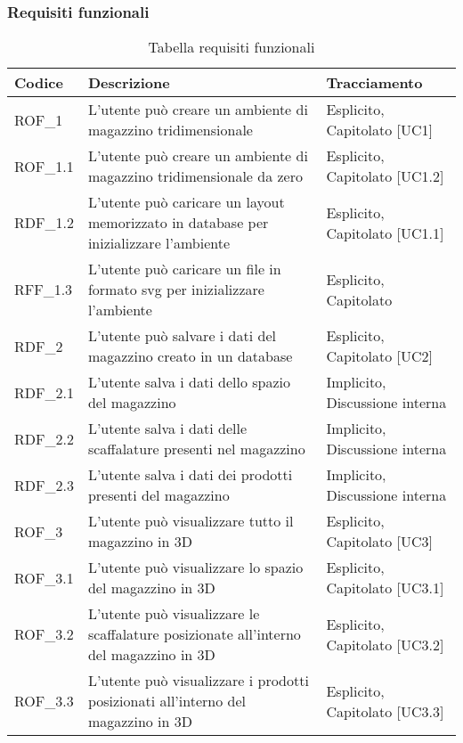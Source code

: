 \subsubsection{Requisiti funzionali}\label{subsec:requisiti_funzionali}
\renewcommand{\arraystretch}{2.5}
\begin{xltabular}{\textwidth}{ p{0.1\textwidth} | X | p{0.3\textwidth} }
    \textbf{\color{white} Codice} & \textbf{\color{white} Descrizione} & \textbf{\color{white} Tracciamento} \\ 
    \endhead

    \caption{Tabella requisiti funzionali} 
    \endlastfoot

    ROF\_1 & L'utente può creare un ambiente di magazzino tridimensionale & Esplicito, Capitolato [UC1]\\
    ROF\_1.1 & L'utente può creare un ambiente di magazzino tridimensionale da zero & Esplicito, Capitolato [UC1.2]\\
    RDF\_1.2 & L'utente può caricare un layout memorizzato in database per inizializzare l'ambiente & Esplicito, Capitolato [UC1.1]\\
    RFF\_1.3 & L'utente può caricare un file in formato svg per inizializzare l'ambiente & Esplicito, Capitolato \\
    RDF\_2 & L'utente può salvare i dati del magazzino creato in un database & Esplicito, Capitolato [UC2]\\  
    RDF\_2.1 & L'utente salva i dati dello spazio del magazzino & Implicito, Discussione interna \\  
    RDF\_2.2 & L'utente salva i dati delle scaffalature presenti nel magazzino & Implicito, Discussione interna \\  
    RDF\_2.3 & L'utente salva i dati dei prodotti presenti del magazzino & Implicito, Discussione interna \\    
    ROF\_3 & L'utente può visualizzare tutto il magazzino in 3D & Esplicito, Capitolato [UC3]\\
    ROF\_3.1 & L'utente può visualizzare lo spazio del magazzino in 3D & Esplicito, Capitolato [UC3.1]\\
    ROF\_3.2 & L'utente può visualizzare le scaffalature posizionate all'interno del magazzino in 3D & Esplicito, Capitolato [UC3.2]\\
    ROF\_3.3 & L'utente può visualizzare i prodotti posizionati all'interno del magazzino in 3D & Esplicito, Capitolato [UC3.3]\\

\end{xltabular}
